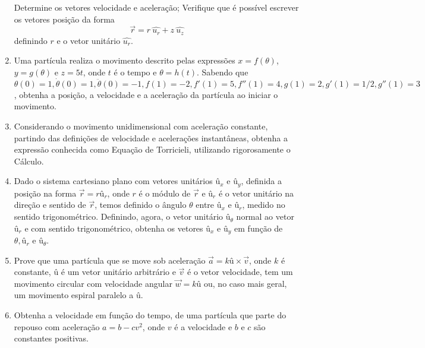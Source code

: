 \documentclass[12pt,a4paper]{article}
\begin{document}
\begin{enumerate}
\begin{tasks}
\task Determine os vetores velocidade e aceleração;
\task Verifique que é possível escrever os vetores posição da forma
$$\vec{r} = r \ \hat{u_r} + z \ \hat{u_z}$$
definindo $r$ e o vetor unitário $\hat{u_r}$.
\end{tasks}

\item Uma partícula realiza o movimento descrito pelas expressões $x = f(\theta)$, $y = g(\theta)$ e $z = 5t$, onde $t$ é o tempo e $\theta = h(t)$. Sabendo que $\theta(0) = 1, \dot{\theta}(0) = 1, \ddot{\theta}(0) = -1, f(1) = -2, f'(1) = 5, f''(1) = 4, g(1) = 2, g'(1) = 1/2, g''(1) = 3$, obtenha a posição, a velocidade e a aceleração da partícula ao iniciar o movimento.

\item Considerando o movimento unidimensional com aceleração constante, partindo das definições de velocidade e acelerações instantâneas,
obtenha a expressão conhecida como Equação de Torricieli, utilizando rigorosamente o Cálculo.

\item Dado o sistema cartesiano plano com vetores unitários $\textrm{û}_x$ e $\textrm{û}_y$, definida a posição na forma $\overrightarrow{r}=r\textrm{û}_r$,
onde $r$ é o módulo de $\overrightarrow{r}$ e $\textrm{û}_r$ é o vetor unitário na direção e sentido de $\overrightarrow{r}$, temos definido o ângulo $\theta$ entre
$\textrm{û}_x$ e $\textrm{û}_r$, medido no sentido trigonométrico. Definindo, agora, o vetor unitário $\textrm{û}_\theta$ normal ao vetor $\textrm{û}_r$ e com sentido trigonométrico,
obtenha os vetores $\textrm{û}_x$ e $\textrm{û}_y$ em função de $\theta,\textrm{û}_r$ e $\textrm{û}_\theta$.

\item Prove que uma partícula que se move sob aceleração $\overrightarrow{a}=k\textrm{û}\times \overrightarrow{v}$, onde $k$ é constante,
$\textrm{û}$ é um vetor unitário arbitrário e $\overrightarrow{v}$ é o vetor velocidade, tem um movimento circular com velocidade angular $\overrightarrow{w}=k\textrm{û}$ ou,
no caso mais geral, um movimento espiral paralelo a $\textrm{û}$.

\item Obtenha a velocidade em função do tempo, de uma partícula que parte do repouso com aceleração $a=b-cv^2$, onde $v$ é a velocidade e
$b$ e $c$ são constantes positivas.

\end{enumerate}
\end{document}
